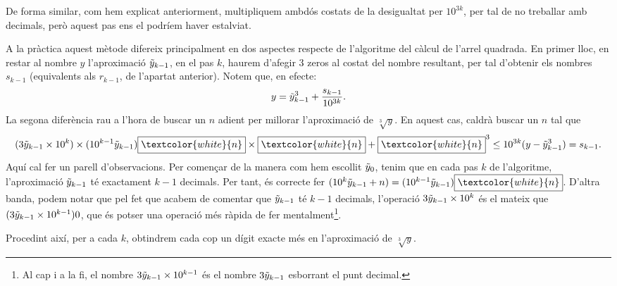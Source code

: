 \documentclass[11pt,a4paper]{article}
\theoremstyle{definition}
\begin{document}
De forma similar, com hem explicat anteriorment, multipliquem ambdós costats de la desigualtat per $10^{3k}$, per tal de no treballar amb decimals, però aquest pas ens el podríem haver estalviat.\par A la pràctica aquest mètode difereix principalment en dos aspectes respecte de l'algoritme del càlcul de l'arrel quadrada. En primer lloc, en restar al nombre $y$ l'aproximació $\Tilde{y}_{k-1}$, en el pas $k$, haurem d'afegir 3 zeros al costat del nombre resultant, per tal d'obtenir els nombres $s_{k-1}$ (equivalents als $r_{k-1}$, de l'apartat anterior). Notem que, en efecte: $$y=\Tilde{y}_{k-1}^3+\frac{s_{k-1}}{10^{3k}}.$$ La segona diferència rau a l'hora de buscar un $n$ adient per millorar l'aproximació de $\sqrt[3]{y}$. En aquest cas, caldrà buscar un $n$ tal que $$(3\Tilde{y}_{k-1}\times10^k)\times(10^{k-1}\Tilde{y}_{k-1})\boxed{\textcolor{white}{n}}\times\boxed{\textcolor{white}{n}}+\boxed{\textcolor{white}{n}}^3\leq 10^{3k}(y-\Tilde{y}_{k-1}^3)=s_{k-1}.$$
Aquí cal fer un parell d'observacions. Per començar de la manera com hem escollit $\Tilde{y}_0$, tenim que en cada pas $k$ de l'algoritme, l'aproximació $\Tilde{y}_{k-1}$ té exactament $k-1$ decimals. Per tant, és correcte fer $(10^k\Tilde{y}_{k-1}+n)=(10^{k-1}\Tilde{y}_{k-1})\boxed{\textcolor{white}{n}}$. D'altra banda, podem notar que pel fet que acabem de comentar que $\Tilde{y}_{k-1}$ té $k-1$ decimals, l'operació $3\Tilde{y}_{k-1}\times10^k$ és el mateix que $(3\Tilde{y}_{k-1}\times10^{k-1})0$, que és potser una operació més ràpida de fer mentalment\footnote{Al cap i a la fi, el nombre $3\Tilde{y}_{k-1}\times10^{k-1}$ és el nombre $3\Tilde{y}_{k-1}$ esborrant el punt decimal.}.\par
Procedint així, per a cada $k$, obtindrem cada cop un dígit exacte més en l'aproximació de $\sqrt[3]{y}$.
\end{document}
